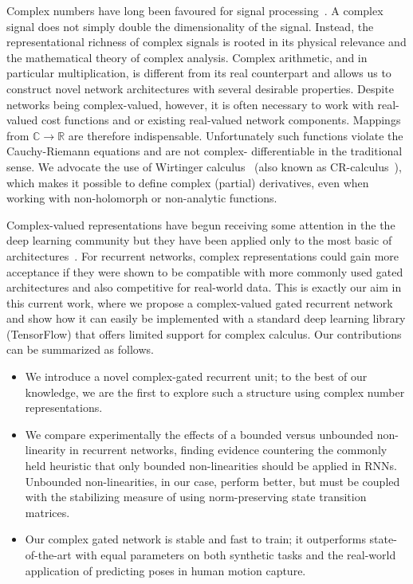 \documentclass{article}
\begin{document}

Complex numbers have long been favoured for signal processing~\cite{hirose2013complex,Li,Mandic}.  A complex signal does not simply double the dimensionality of the signal. Instead, the representational richness of complex signals is rooted in its physical relevance and the mathematical theory of complex analysis. Complex arithmetic, and in particular multiplication, is different from its real counterpart and allows us to construct novel network architectures with several desirable properties. Despite networks being complex-valued, however, it is often necessary to work with real-valued cost functions and or existing real-valued network components. Mappings from $\mathbb{C} \to \mathbb{R}$ are therefore indispensable.  Unfortunately such functions violate the Cauchy-Riemann equations and are not complex- differentiable in the traditional sense.  We advocate the use of Wirtinger calculus~\cite{Wirtinger} (also known as CR-calculus~\cite{Delgado}), which makes it possible to define complex (partial) derivatives, even when working with non-holomorph or non-analytic functions. 

Complex-valued representations have begun receiving some attention in the the deep learning community but they have been applied only to the most basic of architectures~\cite{Arjovsky,Guberman,Trabelsi}. For recurrent networks, complex representations could gain more acceptance if they were shown to be compatible with more commonly used gated architectures and also competitive for real-world data. This is exactly our aim in this current work, where we propose a complex-valued gated recurrent network and show how it can easily be implemented with a standard deep learning library (TensorFlow) that offers limited support for complex calculus. Our contributions can be summarized as follows.
\begin{itemize}
    \item We introduce a novel complex-gated recurrent unit; to the best of our knowledge, we are the first to explore such a structure using complex number representations.  
    \item We compare experimentally the effects of a bounded versus unbounded non-linearity in recurrent networks, finding evidence countering the commonly held heuristic that only bounded non-linearities should be applied in RNNs.  Unbounded non-linearities, in our case, perform better, but must be coupled with the stabilizing measure of using norm-preserving state transition matrices.
    \item Our complex gated network is stable and fast to train; it outperforms state-of-the-art with equal parameters on both synthetic tasks and the real-world application of predicting poses in human motion capture.   
\end{itemize}
\end{document}
